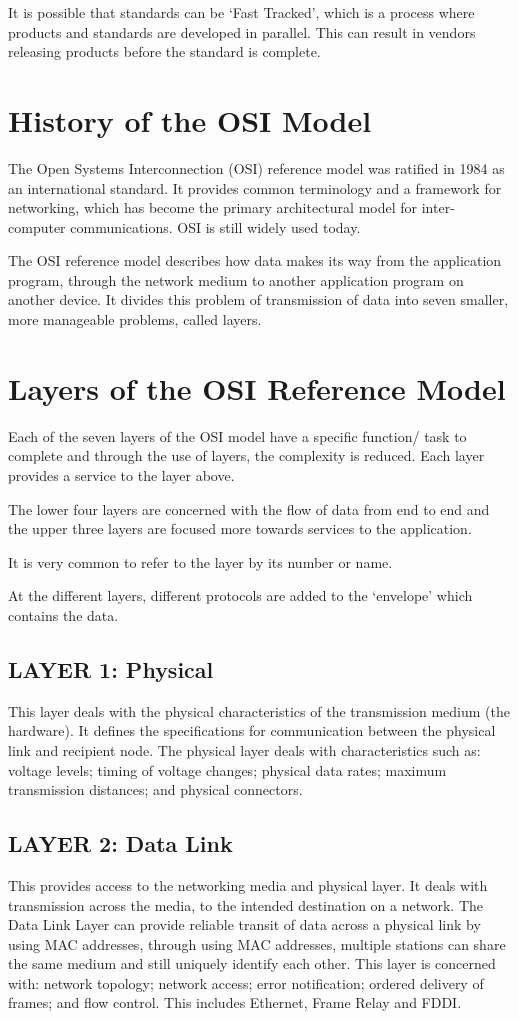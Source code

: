 It is possible that standards can be `Fast Tracked', which is a process where products and standards are developed in parallel. This can result in vendors releasing products before the standard is complete.

\section*{History of the OSI Model}
The Open Systems Interconnection (OSI) reference model was ratified in 1984 as an international standard. It provides common terminology and a framework for networking, which has become the primary architectural model for inter-computer communications. OSI is still widely used today.

The OSI reference model describes how data makes its way from the application program, through the network medium to another application program on another device. It divides this problem of transmission of data into seven smaller, more manageable problems, called layers.

\section*{Layers of the OSI Reference Model}
Each of the seven layers of the OSI model have a specific function/ task to complete and through the use of layers, the complexity is reduced. Each layer provides a service to the layer above.

The lower four layers are concerned with the flow of data from end to end and the upper three layers are focused more towards services to the application. 

It is very common to refer to the layer by its number or name.

At the different layers, different protocols are added to the `envelope' which contains the data. 

\subsection*{LAYER 1: Physical}
This layer deals with the physical characteristics of the transmission medium (the hardware). It defines the specifications for communication between the physical link and recipient node. The physical layer deals with characteristics such as: voltage levels; timing of voltage changes; physical data rates; maximum transmission distances; and physical connectors.

\subsection*{LAYER 2: Data Link}
This provides access to the networking media and physical layer. It deals with transmission across the media, to the intended destination on a network. The Data Link Layer can provide reliable transit of data across a physical link by using MAC addresses, through using MAC addresses, multiple stations can share the same medium and still uniquely identify each other. This layer is concerned with: network topology; network access; error notification; ordered delivery of frames; and flow control. This includes Ethernet, Frame Relay and FDDI.

